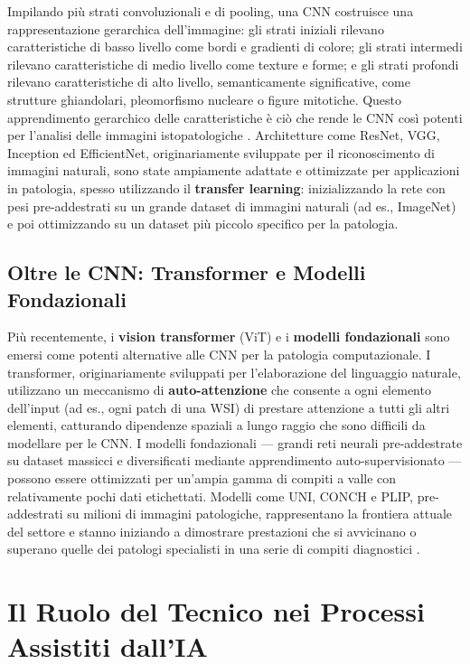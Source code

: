 Impilando più strati convoluzionali e di pooling, una CNN costruisce una rappresentazione gerarchica dell'immagine: gli strati iniziali rilevano caratteristiche di basso livello come bordi e gradienti di colore; gli strati intermedi rilevano caratteristiche di medio livello come texture e forme; e gli strati profondi rilevano caratteristiche di alto livello, semanticamente significative, come strutture ghiandolari, pleomorfismo nucleare o figure mitotiche. Questo apprendimento gerarchico delle caratteristiche è ciò che rende le CNN così potenti per l'analisi delle immagini istopatologiche \cite{komura2018}. Architetture come ResNet, VGG, Inception ed EfficientNet, originariamente sviluppate per il riconoscimento di immagini naturali, sono state ampiamente adattate e ottimizzate per applicazioni in patologia, spesso utilizzando il \textbf{transfer learning}: inizializzando la rete con pesi pre-addestrati su un grande dataset di immagini naturali (ad es., ImageNet) e poi ottimizzando su un dataset più piccolo specifico per la patologia.

\subsection{Oltre le CNN: Transformer e Modelli Fondazionali}

Più recentemente, i \textbf{vision transformer} (ViT) e i \textbf{modelli fondazionali} sono emersi come potenti alternative alle CNN per la patologia computazionale. I transformer, originariamente sviluppati per l'elaborazione del linguaggio naturale, utilizzano un meccanismo di \textbf{auto-attenzione} che consente a ogni elemento dell'input (ad es., ogni patch di una WSI) di prestare attenzione a tutti gli altri elementi, catturando dipendenze spaziali a lungo raggio che sono difficili da modellare per le CNN. I modelli fondazionali — grandi reti neurali pre-addestrate su dataset massicci e diversificati mediante apprendimento auto-supervisionato — possono essere ottimizzati per un'ampia gamma di compiti a valle con relativamente pochi dati etichettati. Modelli come UNI, CONCH e PLIP, pre-addestrati su milioni di immagini patologiche, rappresentano la frontiera attuale del settore e stanno iniziando a dimostrare prestazioni che si avvicinano o superano quelle dei patologi specialisti in una serie di compiti diagnostici \cite{song2023}.

\section{Il Ruolo del Tecnico nei Processi Assistiti dall'IA}
\label{sec:ch3_technician}

